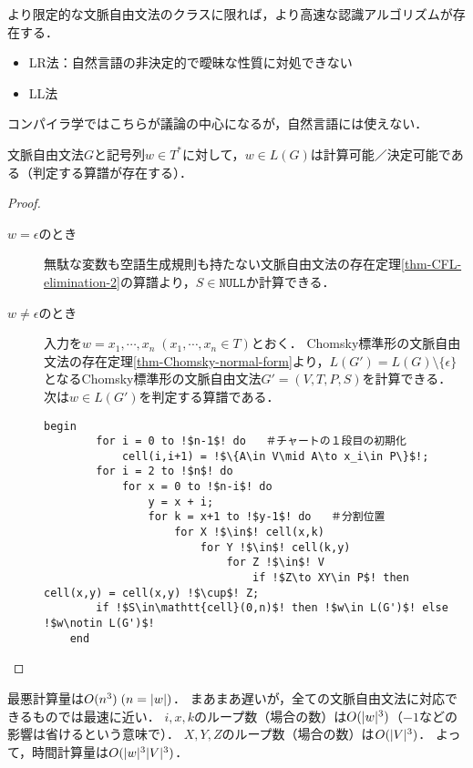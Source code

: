 \documentclass[uplatex, dvipdfmx]{jsreport}
\begin{document}
\begin{remark}
    より限定的な文脈自由文法のクラスに限れば，より高速な認識アルゴリズムが存在する．
    \begin{itemize}
        \item LR法：自然言語の非決定的で曖昧な性質に対処できない
        \item LL法
    \end{itemize}
    コンパイラ学ではこちらが議論の中心になるが，自然言語には使えない．
\end{remark}

\begin{theorem}
    文脈自由文法$G$と記号列$w\in T^*$に対して，$w\in L(G)$は計算可能／決定可能である（判定する算譜が存在する）．
\end{theorem}
\begin{proof}\mbox{}
    \begin{description}
        \item[$w=\epsilon$のとき] 
        無駄な変数も空語生成規則も持たない文脈自由文法の存在定理\ref{thm-CFL-elimination-2}の算譜より，$S\in\mathtt{NULL}$か計算できる．
        \item[$w\ne\epsilon$のとき] 入力を$w=x_1,\cdots,x_n\;(x_1,\cdots,x_n\in T)$とおく．
        Chomsky標準形の文脈自由文法の存在定理\ref{thm-Chomsky-normal-form}より，$L(G')=L(G)\setminus\{\epsilon\}$となるChomsky標準形の文脈自由文法$G'=(V,T,P,S)$を計算できる．
        次は$w\in L(G')$を判定する算譜である．
\begin{lstlisting}[escapechar=!]
    begin
        for i = 0 to !$n-1$! do   ＃チャートの１段目の初期化
            cell(i,i+1) = !$\{A\in V\mid A\to x_i\in P\}$!;
        for i = 2 to !$n$! do
            for x = 0 to !$n-i$! do
                y = x + i;
                for k = x+1 to !$y-1$! do   ＃分割位置
                    for X !$\in$! cell(x,k)
                        for Y !$\in$! cell(k,y)
                            for Z !$\in$! V
                                if !$Z\to XY\in P$! then cell(x,y) = cell(x,y) !$\cup$! Z;
        if !$S\in\mathtt{cell}(0,n)$! then !$w\in L(G')$! else !$w\notin L(G')$!
    end
\end{lstlisting}
    \end{description}
\end{proof}
\begin{remarks}
    最悪計算量は$O(n^3)\;(n=\lvert w\rvert)$．
    まあまあ遅いが，全ての文脈自由文法に対応できるものでは最速に近い．
    $i,x,k$のループ数（場合の数）は$O(\lvert w\rvert^3)$（$-1$などの影響は省けるという意味で）．
    $X,Y,Z$のループ数（場合の数）は$O(\lvert V\rvert^3)$．
    よって，時間計算量は$O(\lvert w\rvert^3\lvert V\rvert^3)$．
\end{remarks}
\end{document}
